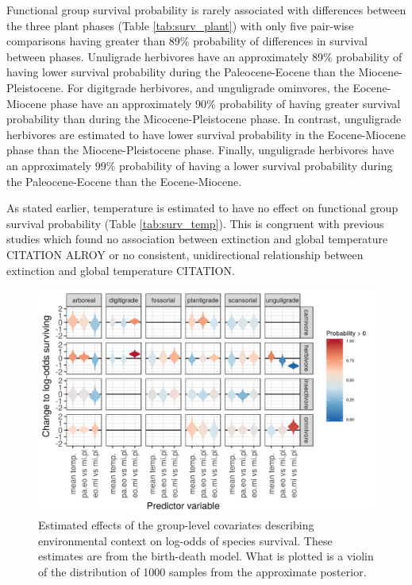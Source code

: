 \documentclass[12pt,letterpaper]{article}
\begin{document}
Functional group survival probability is rarely associated with differences between the three plant phases (Table \ref{tab:surv_plant}) with only five pair-wise comparisons having greater than 89\% probability of differences in survival between phases. Unuligrade herbivores have an approximately 89\% probability of having lower survival probability during the Paleocene-Eocene than the Miocene-Pleistocene. For digitgrade herbivores, and unguligrade ominvores, the Eocene-Miocene phase have an approximately 90\% probability of having greater survival probability than during the Micocene-Pleistocene phase. In contrast, unguligrade herbivores are estimated to have lower survival probability in the Eocene-Miocene phase than the Miocene-Pleistocene phase. Finally, unguligrade herbivores have an approximately 99\% probability of having a lower survival probability during the Paleocene-Eocene than the Eocene-Miocene.

As stated earlier, temperature is estimated to have no effect on functional group survival probability (Table \ref{tab:surv_temp}). This is congruent with previous studies which found no association between extinction and global temperature CITATION ALROY or no consistent, unidirectional relationship between extinction and global temperature CITATION. 

\begin{figure}[ht]
  \centering
  \includegraphics[width=\textwidth,height=0.4\textheight,keepaspectratio=true]{figure/group_on_survival_bd}
  \caption[Effects of group-level covariates on log-odds of ecotype survival as estimated from the birth-death model]{Estimated effects of the group-level covariates describing environmental context on log-odds of species survival. These estimates are from the birth-death model. What is plotted is a violin of the distribution of 1000 samples from the approximate posterior.}
  \label{fig:group_surv_bd}
\end{figure}
\end{document}
